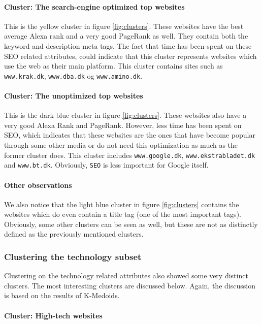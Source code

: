 \paragraph{Cluster: The search-engine optimized top websites}

This is the yellow cluster in figure \ref{fig:clusters}. These websites have the best average {Alexa} rank and a very good {PageRank} as well. They contain both the keyword and description meta tags. The fact that time has been spent on these {SEO} related attributes, could indicate that this cluster represents websites which use the web as their main platform. This cluster contains sites such as \verb|www.krak.dk|, \verb|www.dba.dk| og \verb|www.amino.dk|.

\paragraph{Cluster: The unoptimized top websites}

This is the dark blue cluster in figure \ref{fig:clusters}. These websites also have a very good {Alexa Rank} and {PageRank}. However, less time has been spent on {SEO}, which indicates that these websites are the ones that have become popular through some other media or do not need this optimization as much as the former cluster does. This cluster includes \verb|www.google.dk|, \verb|www.ekstrabladet.dk| and \verb|www.bt.dk|. Obviously, \texttt{SEO} is less important for Google itself.

\paragraph{Other observations} We also notice that the light blue cluster in figure \ref{fig:clusters} contains the websites which do even contain a title tag (one of the most important tags). Obviously, some other clusters can be seen as well, but these are not as distinctly defined as the previously mentioned clusters.

\subsubsection{Clustering the technology subset}

Clustering on the technology related attributes also showed some very distinct clusters. The most interesting clusters are discussed below. Again, the discussion is based on the results of {K-Medoids}.

\paragraph{Cluster: High-tech websites}


